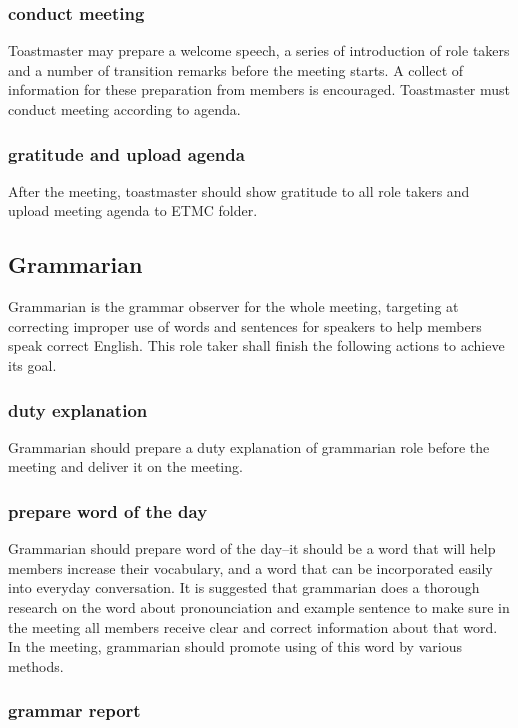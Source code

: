 \subsubsection{conduct meeting}
Toastmaster may prepare a welcome speech, a series of introduction of role takers and 
a number of transition remarks before the meeting starts. A collect of information for
these preparation from members is encouraged. Toastmaster must conduct meeting according
to agenda.

\subsubsection{gratitude and upload agenda}
After the meeting, toastmaster should show gratitude to all role takers and upload 
meeting agenda to ETMC folder. 

\subsection{Grammarian}

Grammarian is the grammar observer for the whole meeting, targeting at correcting improper 
use of words and sentences for speakers to help members speak correct English. This role 
taker shall finish the following actions to achieve its goal.

\subsubsection{duty explanation}

Grammarian should prepare a duty explanation of grammarian role before the meeting and 
deliver it on the meeting.

\subsubsection{prepare word of the day}

Grammarian should prepare word of the day--it should be a word that will help members 
increase their vocabulary, and a word that can be incorporated easily into everyday
conversation. It is suggested that grammarian does a thorough research on the word about
pronounciation and example sentence to make sure in the meeting all members receive  
clear and correct information about that word. In the meeting, grammarian should promote
using of this word by various methods.

\subsubsection{grammar report}

